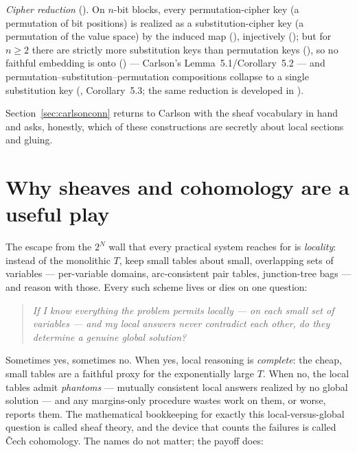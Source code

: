 \documentclass[11pt]{article}
\begin{document}
\emph{Cipher reduction} ().  On $n$-bit
blocks, every permutation-cipher key (a permutation of bit positions)
is realized as a substitution-cipher key (a permutation of the value
space) by the induced map 
(), injectively
(); but for $n \ge 2$ there are strictly more
substitution keys than permutation keys
(), so no faithful
embedding is onto ()
--- Carlson's Lemma~5.1/Corollary~5.2 --- and
permutation--substitution--permutation compositions collapse to a
single substitution key (,
Corollary~5.3; the same reduction is developed in
\citealp{carlson2022equivalence,ghosh2021isomorphic}).

Section~\ref{sec:carlsonconn} returns to Carlson with the sheaf
vocabulary in hand and asks, honestly, which of these constructions
are secretly about local sections and gluing.

\section{Why sheaves and cohomology are a useful play}
\label{sec:why}

The escape from the $2^N$ wall that every practical system reaches
for is \emph{locality}: instead of the monolithic $T$, keep small
tables about small, overlapping sets of variables --- per-variable
domains, arc-consistent pair tables, junction-tree bags --- and
reason with those.  Every such scheme lives or dies on one question:

\begin{quote}
\emph{If I know everything the problem permits locally --- on each
small set of variables --- and my local answers never contradict each
other, do they determine a genuine global solution?}
\end{quote}

Sometimes yes, sometimes no.  When yes, local reasoning is
\emph{complete}: the cheap, small tables are a faithful proxy for the
exponentially large $T$.  When no, the local tables admit
\emph{phantoms} --- mutually consistent local answers realized by no
global solution --- and any margins-only procedure wastes work on
them, or worse, reports them.  The mathematical bookkeeping for
exactly this local-versus-global question is called sheaf theory, and
the device that counts the failures is called \v{C}ech cohomology.
The names do not matter; the payoff does:
\end{document}
